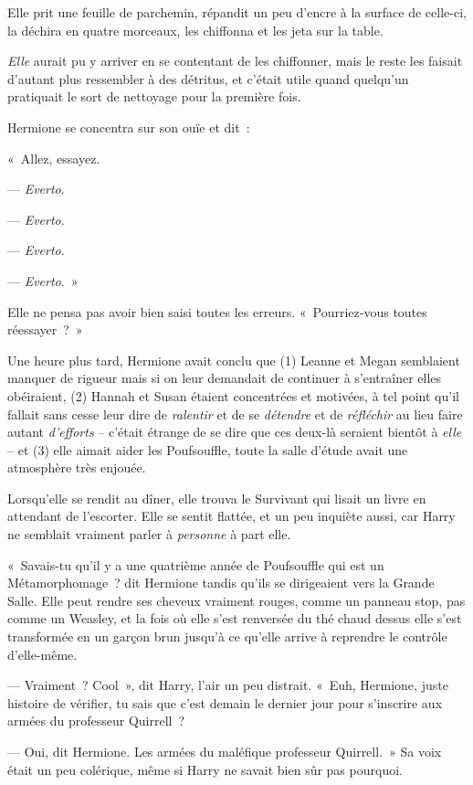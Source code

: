 Elle prit une feuille de parchemin, répandit un peu d'encre à la surface de celle-ci, la déchira en quatre morceaux, les chiffonna et les jeta sur la table.

\emph{Elle} aurait pu y arriver en se contentant de les chiffonner, mais le reste les faisait d'autant plus ressembler à des détritus, et c'était utile quand quelqu'un pratiquait le sort de nettoyage pour la première fois.

Hermione se concentra sur son ouïe et dit~:

«~Allez, essayez.

--- \emph{Everto}.

--- \emph{Everto}.

--- \emph{Everto}.

--- \emph{Everto}.~»

Elle ne pensa pas avoir bien saisi toutes les erreurs.
«~Pourriez-vous toutes réessayer~?~»

Une heure plus tard, Hermione avait conclu que (1) Leanne et Megan semblaient manquer de rigueur mais si on leur demandait de continuer à s'entraîner elles obéiraient, (2) Hannah et Susan étaient concentrées et motivées, à tel point qu'il fallait sans cesse leur dire de \emph{ralentir} et de se \emph{détendre} et de \emph{réfléchir} au lieu faire autant \emph{d'efforts} -- c'était étrange de se dire que ces deux-là seraient bientôt à \emph{elle} -- et (3) elle aimait aider les Poufsouffle, toute la salle d'étude avait une atmosphère très enjouée.

Lorsqu'elle se rendit au dîner, elle trouva le Survivant qui lisait un livre en attendant de l'escorter.
Elle se sentit flattée, et un peu inquiète aussi, car Harry ne semblait vraiment parler à \emph{personne} à part elle.

«~Savais-tu qu'il y a une quatrième année de Poufsouffle qui est un Métamorphomage~? dit Hermione tandis qu'ils se dirigeaient vers la Grande Salle.
Elle peut rendre ses cheveux vraiment rouges, comme un panneau stop, pas comme un Weasley, et la fois où elle s'est renversée du thé chaud dessus elle s'est transformée en un garçon brun jusqu'à ce qu'elle arrive à reprendre le contrôle d'elle-même.

--- Vraiment~?
Cool~», dit Harry, l'air un peu distrait.
«~Euh, Hermione, juste histoire de vérifier, tu sais que c'est demain le dernier jour pour s'inscrire aux armées du professeur Quirrell~?

--- Oui, dit Hermione.
Les armées du maléfique professeur Quirrell.~»
Sa voix était un peu colérique, même si Harry ne savait bien sûr pas pourquoi.


